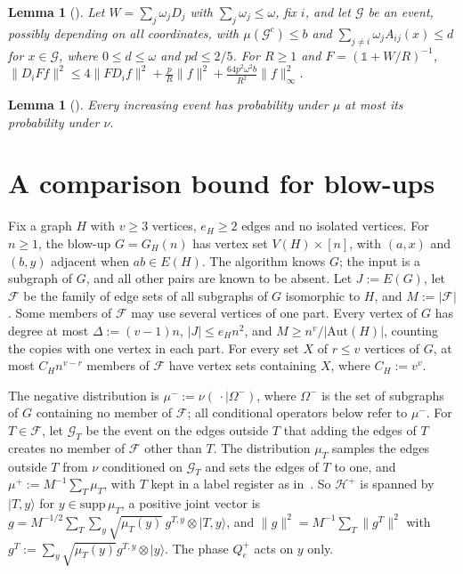 \documentclass[11pt]{article}
\newtheorem{lemma}[theorem]{Lemma}
\theoremstyle{remark}
\newcommand{\Fam}{\mathcal{F}}
\newcommand{\Id}{\mathbb{1}}
\newcommand{\abs}[1]{\lvert #1\rvert}
\newcommand{\norm}[1]{\lVert #1\rVert}
\newcommand{\ket}[1]{\lvert #1\rangle}
\newcommand{\Ev}{\mathcal{G}}
\begin{document}
\begin{lemma}[{\cite[Lemma~4.6]{CGZ26}}]\label{lem:move}
Let $W=\sum_j\omega_jD_j$ with $\sum_j\omega_j\le\omega$, fix $i$, and let $\Ev$ be an event, possibly depending on all coordinates, with $\mu(\Ev^c)\le b$ and $\sum_{j\ne i}\omega_jA_{ij}(x)\le d$ for $x\in\Ev$, where $0\le d\le\omega$ and $pd\le2/5$. For $R\ge1$ and $F=(\Id+W/R)^{-1}$, $\norm{D_iFf}^2\le4\norm{FD_if}^2+\frac pR\norm f^2+\frac{64p^2\omega^2b}{R^2}\norm f_\infty^2$.
\end{lemma}

\begin{lemma}[{\cite[Lemma~5.2]{CGZ26}}]\label{lem:mono}
Every increasing event has probability under $\mu$ at most its probability under $\nu$.
\end{lemma}

\section{A comparison bound for blow-ups}\label{sec:master}

Fix a graph $H$ with $v\ge3$ vertices, $e_H\ge2$ edges and no isolated vertices. For $n\ge1$, the blow-up $G=G_H(n)$ has vertex set $V(H)\times[n]$, with $(a,x)$ and $(b,y)$ adjacent when $ab\in E(H)$. The algorithm knows $G$; the input is a subgraph of $G$, and all other pairs are known to be absent. Let $J:=E(G)$, let $\Fam$ be the family of edge sets of all subgraphs of $G$ isomorphic to $H$, and $M:=\abs\Fam$. Some members of $\Fam$ may use several vertices of one part. Every vertex of $G$ has degree at most $\Delta:=(v-1)n$, $\abs J\le e_Hn^2$, and $M\ge n^v/\abs{\mathrm{Aut}(H)}$, counting the copies with one vertex in each part. For every set $X$ of $r\le v$ vertices of $G$, at most $C_Hn^{v-r}$ members of $\Fam$ have vertex sets containing $X$, where $C_H:=v^v$.

The negative distribution is $\mu^-:=\nu(\,\cdot\mid\Omega^-)$, where $\Omega^-$ is the set of subgraphs of $G$ containing no member of $\Fam$; all conditional operators below refer to $\mu^-$. For $T\in\Fam$, let $\Ev_T$ be the event on the edges outside $T$ that adding the edges of $T$ creates no member of $\Fam$ other than $T$. The distribution $\mu_T$ samples the edges outside $T$ from $\nu$ conditioned on $\Ev_T$ and sets the edges of $T$ to one, and $\mu^+:=M^{-1}\sum_T\mu_T$, with $T$ kept in a label register as in~\cite[(5.3)]{CGZ26}. So $\mathcal H^+$ is spanned by $\ket{T,y}$ for $y\in\mathrm{supp}\,\mu_T$, a positive joint vector is $g=M^{-1/2}\sum_T\sum_y\sqrt{\mu_T(y)}\,g^{T,y}\otimes\ket{T,y}$, and $\norm g^2=M^{-1}\sum_T\norm{g^T}^2$ with $g^T:=\sum_y\sqrt{\mu_T(y)}g^{T,y}\otimes\ket y$. The phase $Q_e^+$ acts on $y$ only.
\end{document}
